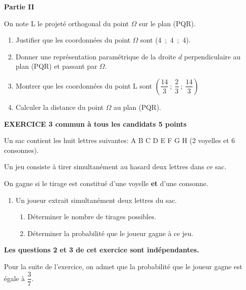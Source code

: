 \documentclass[11pt]{article}
\begin{document}
\bigskip

\textbf{Partie II}

\medskip

On note L le projeté orthogonal du point $\Omega$ sur le plan (PQR).

\medskip

\begin{enumerate}
\item Justifier que les coordonnées du point $\Omega$ sont (4~;~4~;~4).
\item Donner une représentation paramétrique de la droite $d$ perpendiculaire au plan (PQR) et passant par $\Omega$.
\item Montrer que les coordonnées du point L sont $\left(\dfrac{14}{3}~;~ \dfrac{2}{3}~;~\dfrac{14}{3}\right)$
\item Calculer la distance du point $\Omega$ au plan (PQR).
\end{enumerate}


\bigskip

\textbf{EXERCICE 3 commun à tous les candidats \hfill 5 points}

\medskip

Un sac contient les huit lettres suivantes: A B C D E F G H (2 voyelles et 6 consonnes).

Un jeu consiste à tirer simultanément au hasard deux lettres dans ce sac. 

On gagne si le tirage est constitué d'une voyelle \textbf{et} d'une consonne.

\medskip

\begin{enumerate}
\item Un joueur extrait simultanément deux lettres du sac.
	\begin{enumerate}
		\item Déterminer le nombre de tirages possibles.
		\item Déterminer la probabilité que le joueur gagne à ce jeu.
	\end{enumerate}
\end{enumerate}

\medskip
	
\textbf{Les questions 2 et 3 de cet exercice sont indépendantes.}

\medskip

Pour la suite de l'exercice, on admet que la probabilité que le joueur gagne est égale à $\dfrac{3}{7}$.
\end{document}
